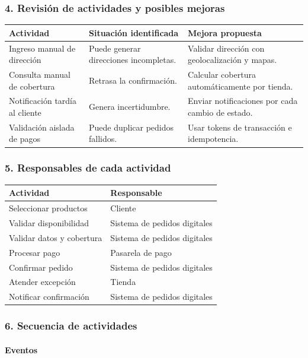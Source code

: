 \documentclass[a4paper,12pt]{article}
\begin{document}
\subsubsection*{4. Revisión de actividades y posibles mejoras}

\begin{longtable}{P{5cm} P{4cm} P{5cm}}
\toprule
\textbf{Actividad} & \textbf{Situación identificada} & \textbf{Mejora propuesta} \\
\midrule
Ingreso manual de dirección & Puede generar direcciones incompletas. & Validar dirección con geolocalización y mapas. \\
Consulta manual de cobertura & Retrasa la confirmación. & Calcular cobertura automáticamente por tienda. \\
Notificación tardía al cliente & Genera incertidumbre. & Enviar notificaciones por cada cambio de estado. \\
Validación aislada de pagos & Puede duplicar pedidos fallidos. & Usar tokens de transacción e idempotencia. \\
\bottomrule
\end{longtable}

\subsubsection*{5. Responsables de cada actividad}

\begin{longtable}{P{7cm} P{7cm}}
\toprule
\textbf{Actividad} & \textbf{Responsable} \\
\midrule
Seleccionar productos & Cliente \\
Validar disponibilidad & Sistema de pedidos digitales \\
Validar datos y cobertura & Sistema de pedidos digitales \\
Procesar pago & Pasarela de pago \\
Confirmar pedido & Sistema de pedidos digitales \\
Atender excepción & Tienda \\
Notificar confirmación & Sistema de pedidos digitales \\
\bottomrule
\end{longtable}

\subsubsection*{6. Secuencia de actividades}

\paragraph{Eventos}
\end{document}

